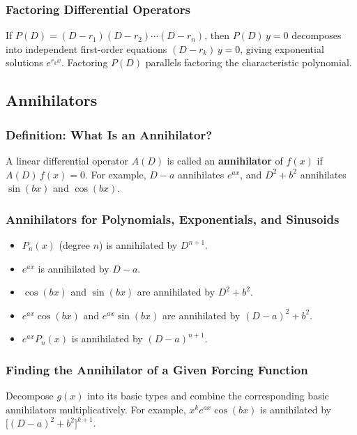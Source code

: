 \documentclass[10pt]{article}
\newcommand{\m}[1]{$#1$}
\begin{document}
    \subsubsection{Factoring Differential Operators}
    If \m{P(D) = (D - r_1)(D - r_2)\cdots(D - r_n)}, then \m{P(D)\,y = 0} decomposes into independent
    first-order equations \m{(D - r_k)\,y = 0}, giving exponential solutions \m{e^{r_k x}}.
    Factoring \m{P(D)} parallels factoring the characteristic polynomial.

\subsection{Annihilators}

    \subsubsection{Definition: What Is an Annihilator?}
    A linear differential operator \m{A(D)} is called an \textbf{annihilator} of \m{f(x)} if
    \m{A(D)\,f(x) = 0}.
    For example, \m{D - a} annihilates \m{e^{ax}}, and \m{D^2 + b^2} annihilates \m{\sin(bx)} and
    \m{\cos(bx)}.

    \subsubsection{Annihilators for Polynomials, Exponentials, and Sinusoids}
    \begin{itemize}
        \item \m{P_n(x)} (degree \m{n}) is annihilated by \m{D^{n+1}}.
        \item \m{e^{ax}} is annihilated by \m{D - a}.
        \item \m{\cos(bx)} and \m{\sin(bx)} are annihilated by \m{D^2 + b^2}.
        \item \m{e^{ax}\cos(bx)} and \m{e^{ax}\sin(bx)} are annihilated by \m{(D-a)^2 + b^2}.
        \item \m{e^{ax}P_n(x)} is annihilated by \m{(D-a)^{n+1}}.
    \end{itemize}

    \subsubsection{Finding the Annihilator of a Given Forcing Function}
    Decompose \m{g(x)} into its basic types and combine the corresponding basic annihilators
    multiplicatively. For example, \m{x^k e^{ax}\cos(bx)} is annihilated by
    \m{\bigl[(D-a)^2 + b^2\bigr]^{k+1}}.
\end{document}
